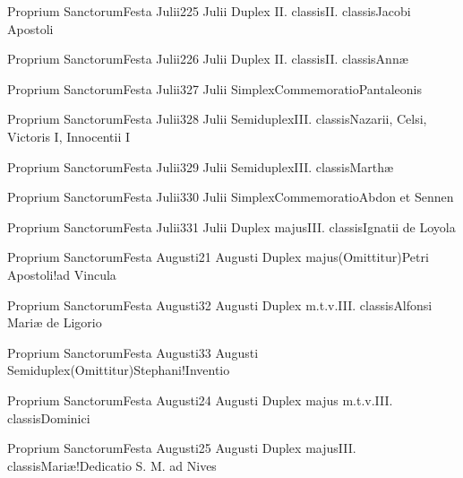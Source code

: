 \documentclass[psalterium-feriale.tex]{subfiles}
\begin{document}
	{Proprium Sanctorum}{Festa Julii}{2}{25 Julii}
	{Duplex II. classis}{II. classis}{Jacobi Apostoli}
	{}
	{}
\psalmodiapropria

	{Proprium Sanctorum}{Festa Julii}{2}{26 Julii}
	{Duplex II. classis}{II. classis}{Annæ}
	{}
	{}
\psalmodiapropria

	{Proprium Sanctorum}{Festa Julii}{3}{27 Julii}
	{Simplex}{Commemoratio}{Pantaleonis}
	{}
	{}
\UMEXaRubric

	{Proprium Sanctorum}{Festa Julii}{3}{28 Julii}
	{Semiduplex}{III. classis}{Nazarii, Celsi, Victoris I, Innocentii I}
	{}
	{}
\PMEXaRubric

	{Proprium Sanctorum}{Festa Julii}{3}{29 Julii}
	{Semiduplex}{III. classis}{Marthæ}
	{}
	{}
\MUVNaRubric

	{Proprium Sanctorum}{Festa Julii}{3}{30 Julii}
	{Simplex}{Commemoratio}{Abdon et Sennen}
	{}
	{}
\PMEXaRubric

	{Proprium Sanctorum}{Festa Julii}{3}{31 Julii}
	{Duplex majus}{III. classis}{Ignatii de Loyola}
	{}
	{}
\COPOcRubric

	{Proprium Sanctorum}{Festa Augusti}{2}{1 Augusti}
	{Duplex majus}{(Omittitur)}{Petri Apostoli!ad Vincula}
	{}
	{}
\psalmodiapropria

	{Proprium Sanctorum}{Festa Augusti}{3}{2 Augusti}
	{Duplex m.t.v.}{III. classis}{Alfonsi Mariæ de Ligorio}
	{}
	{}
\COPObRubric

	{Proprium Sanctorum}{Festa Augusti}{3}{3 Augusti}
	{Semiduplex}{(Omittitur)}{Stephani!Inventio}
	{}
	{}
\UMEXaRubric

	{Proprium Sanctorum}{Festa Augusti}{2}{4 Augusti}
	{Duplex majus m.t.v.}{III. classis}{Dominici}
	{}
	{}
\COPOcRubric

	{Proprium Sanctorum}{Festa Augusti}{2}{5 Augusti}
	{Duplex majus}{III. classis}{Mariæ!Dedicatio S. M. ad Nives}
	{\psalmodiapropria}
	{\CBMVRubric}
\end{document}
